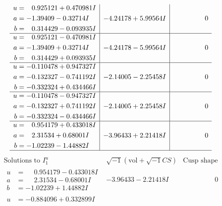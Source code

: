 \documentclass[1p]{elsarticle_modified}
\theoremstyle{definition}
\newcommand{\I}{\sqrt{-1}}
\begin{document}
$$\begin{array}{c|c|c}
\begin{aligned}
u &= \phantom{-}0.925121 + 0.470981 I \\
a &= -1.39409 - 0.32714 I \\
b &= \phantom{-}0.314429 - 0.093935 I\end{aligned}
 & -4.24178 + 5.99564 I & \phantom{-0.000000 } 0 \\ \hline\begin{aligned}
u &= \phantom{-}0.925121 - 0.470981 I \\
a &= -1.39409 + 0.32714 I \\
b &= \phantom{-}0.314429 + 0.093935 I\end{aligned}
 & -4.24178 - 5.99564 I & \phantom{-0.000000 } 0 \\ \hline\begin{aligned}
u &= -0.110478 + 0.947327 I \\
a &= -0.132327 - 0.741192 I \\
b &= -0.332324 + 0.434466 I\end{aligned}
 & -2.14005 - 2.25458 I & \phantom{-0.000000 } 0 \\ \hline\begin{aligned}
u &= -0.110478 - 0.947327 I \\
a &= -0.132327 + 0.741192 I \\
b &= -0.332324 - 0.434466 I\end{aligned}
 & -2.14005 + 2.25458 I & \phantom{-0.000000 } 0 \\ \hline\begin{aligned}
u &= \phantom{-}0.954179 + 0.433018 I \\
a &= \phantom{-}2.31534 + 0.68001 I \\
b &= -1.02239 - 1.44882 I\end{aligned}
 & -3.96433 + 2.21418 I & \phantom{-0.000000 } 0\\
 \hline 
 \end{array}$$\newpage$$\begin{array}{c|c|c}  
\text{Solutions to }I^u_{1}& \I (\text{vol} + \sqrt{-1}CS) & \text{Cusp shape}\\
 \hline 
\begin{aligned}
u &= \phantom{-}0.954179 - 0.433018 I \\
a &= \phantom{-}2.31534 - 0.68001 I \\
b &= -1.02239 + 1.44882 I\end{aligned}
 & -3.96433 - 2.21418 I & \phantom{-0.000000 } 0 \\ \hline\begin{aligned}
u &= -0.884096 + 0.332899 I \\

\end{aligned}
\end{array}$$
\end{document}
